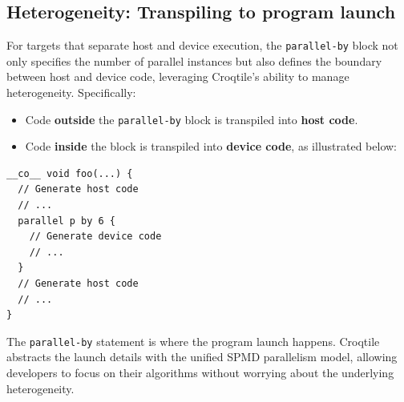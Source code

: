 \subsection*{Heterogeneity: Transpiling to program launch}

For targets that separate host and device execution, the \texttt{parallel-by} block not only specifies the number of parallel instances but also defines the boundary between host and device code, leveraging Croqtile's ability to manage heterogeneity. Specifically:

\begin{itemize}[leftmargin=1.6em]
\item Code \textbf{outside} the \texttt{parallel-by} block is transpiled into \textbf{host code}.
\item Code \textbf{inside} the block is transpiled into \textbf{device code}, as illustrated below:
\end{itemize}

\begin{lstlisting}[language=croqtile,caption={Heterogeneity: Transpiling to program launch}]
__co__ void foo(...) {
  // Generate host code
  // ...
  parallel p by 6 {
    // Generate device code
    // ...
  }
  // Generate host code
  // ...
}
\end{lstlisting}

The \texttt{parallel-by} statement is where the program launch happens. Croqtile abstracts the launch details with the unified SPMD parallelism model, allowing developers to focus on their algorithms without worrying about the underlying heterogeneity.
